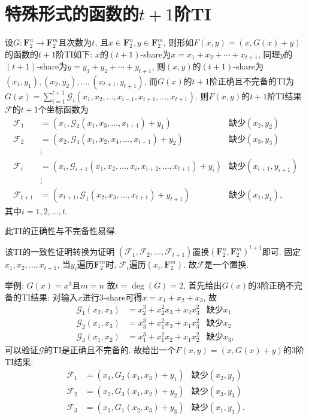 \documentclass[a4paper,12pt]{ctexart}
\newcommand{\F}{\mathbf{F}}
\begin{document}
    \section*{特殊形式的函数的$t+1$阶TI}
    设$G:\F_2^n\rightarrow\F_2^m$且次数为$t$, 且$x\in\F_2^n,y\in\F_2^m$, 则形如$F(x,y)=(x,G(x)+y)$的函数的$t+1$阶TI如下:
    $x$的$(t+1)$-share为$x=x_1+x_2+\cdots+x_{t+1}$, 同理$y$的$(t+1)$-share为$y=y_1+y_2+\cdots+y_{t+1}$, 则$(x,y)$的$(t+1)$-share为$(x_1,y_1),(x_2,y_2),\dots,(x_{t+1},y_{t+1})$, 而$G(x)$的$t+1$阶正确且不完备的TI为$G(x)=\sum_{i=1}^{t+1}\mathcal{G}_i(x_1,x_2,\dots,x_{i-1},x_{i+1},\dots,x_{t+1})$. 则$F(x,y)$的$t+1$阶TI结果$\mathcal{F}$的$t+1$个坐标函数为
    \begin{align}
        \mathcal{F}_1 &= (x_1,\mathcal{G}_2(x_1,x_3,\dots,x_{t+1})+y_1)&\text{缺少}(x_2,y_2)\\
        \mathcal{F}_2 &= (x_2,\mathcal{G}_3(x_1,x_2,x_4,\dots,x_{t+1})+y_2)&\text{缺少}(x_3,y_3)\\
        &\vdots&\\
        \mathcal{F}_i &= (x_i,\mathcal{G}_{i+1}(x_1,x_2,\dots,x_{i},x_{i+2},\dots,x_{t+1})+y_i)&\text{缺少}(x_{i+1},y_{i+1})\\
        &\vdots&\\
        \mathcal{F}_{t+1} &= (x_{t+1},\mathcal{G}_1(x_2,x_3,\dots,x_{t+1})+y_{t+1})&\text{缺少}(x_1,y_1),
    \end{align}
    其中$i=1,2,\dots,t$.

    此TI的正确性与不完备性易得.

    该TI的一致性证明转换为证明 $(\mathcal{F}_1,\mathcal{F}_2,\dots,\mathcal{F}_{t+1})$置换$(\F_2^n,\F_2^m)^{t+1}$即可. 固定$x_1,x_2,\dots,x_{t+1}$, 当$y_i$遍历$\F_2^m$时, $\mathcal{F}_i$遍历$(x_i,\F_2^m)$. 故$\mathcal{F}$是一个置换. 

    举例: $G(x)=x^3$且$m=n$ 故$t=\deg(G)=2$, 首先给出$G(x)$的$3$阶正确不完备的TI结果:
    对输入$x$进行3-share可得$x=x_1+x_2+x_3$, 故
    \begin{align}
        \mathcal{G}_1(x_2,x_3) &= x_2^3 + x_2^2x_3+x_2x_3^2&\text{缺少}x_1\\
        \mathcal{G}_2(x_1,x_3) &= x_3^3 + x_1^2x_3+x_1x_3^2&\text{缺少}x_2\\
        \mathcal{G}_3(x_1,x_2) &= x_1^3 + x_1^2x_2+x_1x_2^2&\text{缺少}x_3,
    \end{align}
    可以验证$\mathcal{G}$的TI是正确且不完备的. 
    故给出一个$F(x,y)=(x,G(x)+y)$的$3$阶TI结果: 
    \begin{align}
        \mathcal{F}_1 &= (x_1,G_2(x_1,x_3)+y_1)&\text{缺少}(x_2,y_2)\\
        \mathcal{F}_2 &= (x_2,G_3(x_1,x_2)+y_2)&\text{缺少}(x_3,y_3)\\
        \mathcal{F}_3 &= (x_3,G_1(x_2,x_3)+y_3)&\text{缺少}(x_1,y_1).
    \end{align}
\end{document}
